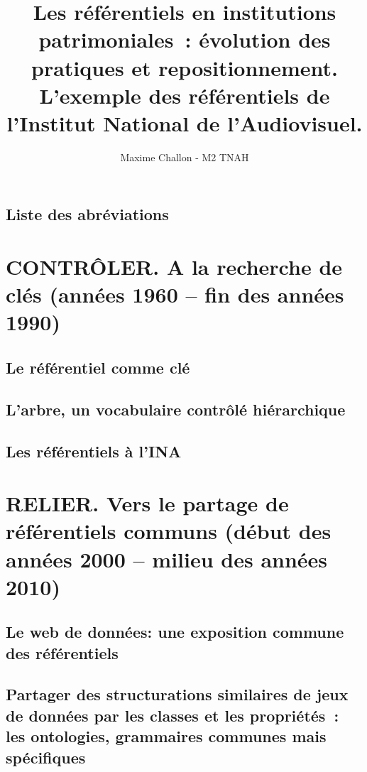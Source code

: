 \documentclass[a4paper,12pt,twoside]{book}
\author{Maxime Challon - M2 TNAH}
\title{Les référentiels en institutions patrimoniales : évolution des pratiques et repositionnement. L’exemple des référentiels de l’Institut National de l’Audiovisuel.}
\begin{document}
	
	\frontmatter
	
	
	
	
	
	
	\chapter*{Liste des abréviations}
	\printacronyms[heading=none]
	
	
	
	\mainmatter
	
	\part{\label{controler}CONTRÔLER. A la recherche de clés (années 1960 – fin des années 1990)}
	
	\chapter{\label{I-A}Le référentiel comme clé}
	\chapter{\label{I-B}L'arbre, un vocabulaire contrôlé hiérarchique}
	\chapter{\label{I-C}Les référentiels à l’INA}
	
	\part{\label{relier}RELIER. Vers le partage de référentiels communs (début des années 2000 – milieu des années 2010)}
	
	\chapter{\label{II-A}Le web de données: une exposition commune des référentiels}
	\chapter{\label{II-B}Partager des structurations similaires de jeux de données par les classes et les propriétés : les ontologies, grammaires communes mais spécifiques}
\end{document}
